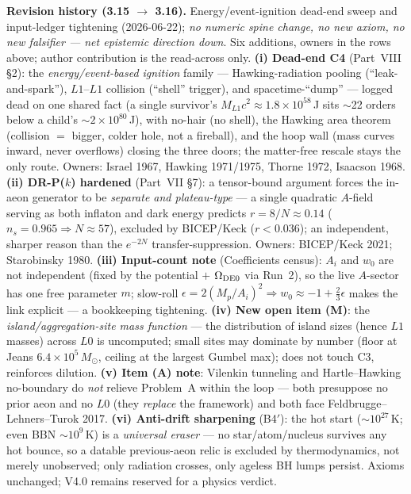 \documentclass[11pt]{article}
\newcommand{\msun}{M_\odot}
\begin{document}
{\smallskip\noindent\textbf{Revision history (3.15 $\to$ 3.16).} Energy/event-ignition dead-end sweep and input-ledger tightening (2026-06-22); \emph{no numeric spine change, no new axiom, no new falsifier --- net epistemic direction down}. Six additions, owners in the rows above; author contribution is the read-across only. \textbf{(i) Dead-end C4} (Part~VIII \S2): the \emph{energy/event-based ignition} family --- Hawking-radiation pooling (``leak-and-spark''), $L1$--$L1$ collision (``shell'' trigger), and spacetime-``dump'' --- logged dead on one shared fact (a single survivor's $M_{L1}c^2\approx1.8\times10^{58}$\,J sits $\sim$22 orders below a child's $\sim2\times10^{80}$\,J), with no-hair (no shell), the Hawking area theorem (collision $=$ bigger, colder hole, not a fireball), and the hoop wall (mass curves inward, never overflows) closing the three doors; the matter-free rescale stays the only route. Owners: Israel 1967, Hawking 1971/1975, Thorne 1972, Isaacson 1968. \textbf{(ii) DR-P($k$) hardened} (Part~VII \S7): a tensor-bound argument forces the in-aeon generator to be \emph{separate and plateau-type} --- a single quadratic $A$-field serving as both inflaton and dark energy predicts $r=8/N\approx0.14$ ($n_s=0.965\Rightarrow N\approx57$), excluded by BICEP/Keck ($r<0.036$); an independent, sharper reason than the $e^{-2N}$ transfer-suppression. Owners: BICEP/Keck 2021; Starobinsky 1980. \textbf{(iii) Input-count note} (Coefficients census): $A_i$ and $w_0$ are not independent (fixed by the potential $+$ $\Omega_{\rm DE0}$ via Run~2), so the live $A$-sector has one free parameter $m$; slow-roll $\epsilon=2(M_p/A_i)^2\Rightarrow w_0\approx-1+\tfrac23\epsilon$ makes the link explicit --- a bookkeeping tightening. \textbf{(iv) New open item (M)}: the \emph{island/aggregation-site mass function} --- the distribution of island sizes (hence $L1$ masses) across $L0$ is uncomputed; small sites may dominate by number (floor at Jeans $6.4\times10^{5}\,\msun$, ceiling at the largest Gumbel max); does not touch C3, reinforces dilution. \textbf{(v) Item (A) note}: Vilenkin tunneling and Hartle--Hawking no-boundary do \emph{not} relieve Problem~A within the loop --- both presuppose no prior aeon and no $L0$ (they \emph{replace} the framework) and both face Feldbrugge--Lehners--Turok 2017. \textbf{(vi) Anti-drift sharpening} (B4$'$): the hot start ($\sim10^{27}$\,K; even BBN $\sim10^{9}$\,K) is a \emph{universal eraser} --- no star/atom/nucleus survives any hot bounce, so a datable previous-aeon relic is excluded by thermodynamics, not merely unobserved; only radiation crosses, only ageless BH lumps persist. Axioms unchanged; V4.0 remains reserved for a physics verdict.

}
\end{document}
